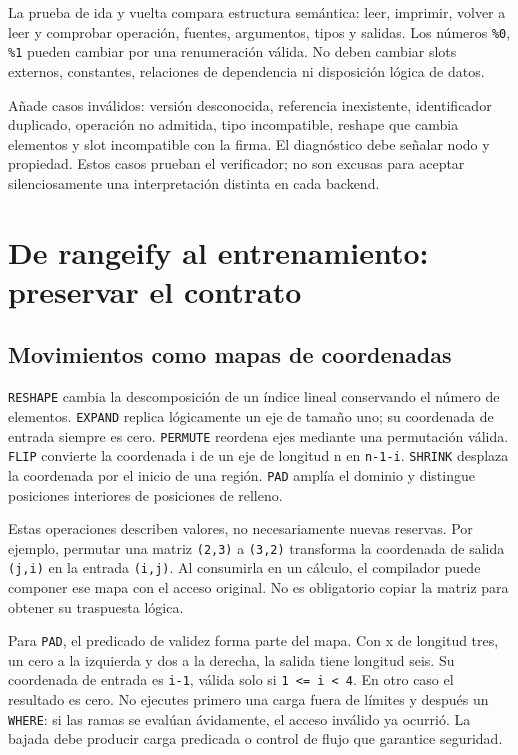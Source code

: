 \documentclass[12pt,a4paper,oneside]{report}
\begin{document}
La prueba de ida y vuelta compara estructura semántica: leer, imprimir, volver a leer y comprobar operación, fuentes, argumentos, tipos y salidas. Los números \texttt{\%0}, \texttt{\%1} pueden cambiar por una renumeración válida. No deben cambiar slots externos, constantes, relaciones de dependencia ni disposición lógica de datos.

Añade casos inválidos: versión desconocida, referencia inexistente, identificador duplicado, operación no admitida, tipo incompatible, reshape que cambia elementos y slot incompatible con la firma. El diagnóstico debe señalar nodo y propiedad. Estos casos prueban el verificador; no son excusas para aceptar silenciosamente una interpretación distinta en cada backend.

\chapter{De rangeify al entrenamiento: preservar el contrato}
\label{curso:rangeify}
\section{Movimientos como mapas de coordenadas}
\texttt{RESHAPE} cambia la descomposición de un índice lineal conservando el número de elementos. \texttt{EXPAND} replica lógicamente un eje de tamaño uno; su coordenada de entrada siempre es cero. \texttt{PERMUTE} reordena ejes mediante una permutación válida. \texttt{FLIP} convierte la coordenada i de un eje de longitud n en \texttt{n-1-i}. \texttt{SHRINK} desplaza la coordenada por el inicio de una región. \texttt{PAD} amplía el dominio y distingue posiciones interiores de posiciones de relleno.

Estas operaciones describen valores, no necesariamente nuevas reservas. Por ejemplo, permutar una matriz \texttt{(2,3)} a \texttt{(3,2)} transforma la coordenada de salida \texttt{(j,i)} en la entrada \texttt{(i,j)}. Al consumirla en un cálculo, el compilador puede componer ese mapa con el acceso original. No es obligatorio copiar la matriz para obtener su traspuesta lógica.

Para \texttt{PAD}, el predicado de validez forma parte del mapa. Con x de longitud tres, un cero a la izquierda y dos a la derecha, la salida tiene longitud seis. Su coordenada de entrada es \texttt{i-1}, válida solo si \texttt{1 <= i < 4}. En otro caso el resultado es cero. No ejecutes primero una carga fuera de límites y después un \texttt{WHERE}: si las ramas se evalúan ávidamente, el acceso inválido ya ocurrió. La bajada debe producir carga predicada o control de flujo que garantice seguridad.
\end{document}
